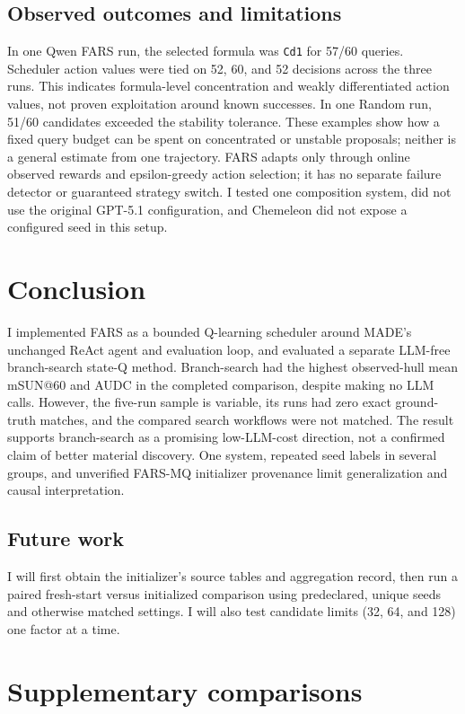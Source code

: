 \documentclass[11pt,a4paper]{article}
\begin{document}
\subsection{Observed outcomes and limitations}
In one Qwen FARS run, the selected formula was \texttt{Cd1} for 57/60
queries. Scheduler action values were tied on 52, 60, and 52 decisions
across the three runs. This indicates formula-level concentration and
weakly differentiated action values, not proven exploitation around known
successes. In one Random run, 51/60 candidates exceeded the stability
tolerance. These examples show how a fixed query budget can be spent on
concentrated or unstable proposals; neither is a general estimate from one
trajectory. FARS adapts only through online observed rewards and
epsilon-greedy action selection; it has no separate failure detector or
guaranteed strategy switch. I tested one composition system, did not use
the original GPT-5.1 configuration, and Chemeleon did not expose a
configured seed in this setup.

\section{Conclusion}
I implemented FARS as a bounded Q-learning scheduler around MADE's
unchanged ReAct agent and evaluation loop, and evaluated a separate
LLM-free branch-search state-Q method. Branch-search had the highest
observed-hull mean mSUN@60 and AUDC in the completed comparison, despite
making no LLM calls. However, the five-run sample is variable, its runs had
zero exact ground-truth matches, and the compared search workflows were not
matched. The result supports branch-search as a promising low-LLM-cost
direction, not a confirmed claim of better material discovery. One system,
repeated seed labels in several groups, and unverified FARS-MQ initializer
provenance limit generalization and causal interpretation.

\subsection{Future work}
I will first obtain the initializer's source tables and aggregation record,
then run a paired fresh-start versus initialized comparison using
predeclared, unique seeds and otherwise matched settings. I will also test
candidate limits (32, 64, and 128) one factor at a time.

\appendix
\section{Supplementary comparisons}
\label{app:supplementary}
\end{document}
